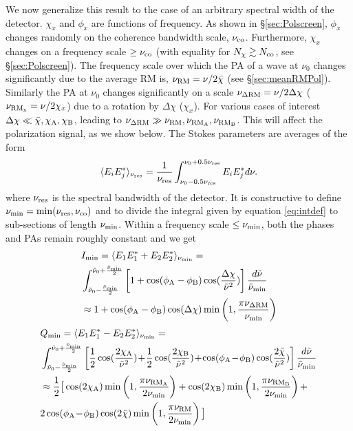 \documentclass[fleqn,usenatbib]{mnras}
\begin{document}
	
	We now generalize this result to the case of an arbitrary spectral width of the detector.
	$\chi_x$ and $\phi_x$ are functions of frequency. As shown in \S \ref{sec:Polscreen}, $\phi_x$ changes randomly on the coherence bandwidth scale, $\nu_{\rm co}$. Furthermore, $\chi_x$ changes on a frequency scale $\geq \nu_{\rm co}$ (with equality for $N_{\chi}\gtrsim N_{\rm co}$, see \S \ref{sec:Polscreen}).
	The frequency scale over which the PA of a wave at $\nu_0$ changes significantly due to the average RM is, $\nu_{\rm RM}=\nu/2\bar{\chi}$ (see \S \ref{sec:meanRMPol}). Similarly the PA at $\nu_0$ changes significantly on a scale $\nu_{\rm \Delta RM}=\nu/2\Delta\chi$ ( $\nu_{\rm RM_x}=\nu/2\chi_x$) due to a rotation by $\Delta \chi$ ($\chi_x$). For various cases of interest $\Delta \chi \ll \bar{\chi},\chi_{\rm A},\chi_{\rm B}$, leading to $\nu_{\rm \Delta RM}\gg\nu_{\rm RM}, \nu_{\rm RM_A}, \nu_{\rm RM_B}$. This will affect the polarization signal, as we show below.
	The Stokes parameters are averages of the form 
	\begin{equation}
		\label{eq:intdef}
		\langle E_{i}E_{j}^*\rangle_{\nu_{\rm res}}  = \frac{1}{\nu_{\rm res}}\int_{\nu_0-0.5\nu_{\rm res}}^{\nu_0+0.5\nu_{\rm res}}E_iE_j^*d\nu.
	\end{equation}
	where $\nu_{\rm res}$ is the spectral bandwidth of the detector. It is constructive to define $\nu_{\rm min}=\min(\nu_{\rm res},\nu_{\rm co})$ and to divide the integral given by equation \ref{eq:intdef} to sub-sections of length $\nu_{\rm min}$. Within a frequency scale $\leq \nu_{\rm min}$, both the phases and PAs remain roughly constant and we get
	\begin{eqnarray}
		\label{eq:Imin}
		& I_{\rm min}=\langle E_{1}E_{1}^*+E_{2}E_{2}^*\rangle_{\nu_{\rm min}}=\\ &
		\int_{\tilde{\nu}_0-\frac{\tilde{\nu}_{\rm min}}{2}}^{\tilde{\nu}_0+\frac{\tilde{\nu}_{\rm min}}{2}}\left[1+\cos(\phi_{\rm A}-\phi_{\rm B})\cos(\frac{\Delta \chi}{\tilde{\nu}^2})\right]\frac{d\tilde{\nu}}{\tilde{\nu}_{\rm min}}\nonumber\\&
		\approx 1+\cos(\phi_{\rm A}-\phi_{\rm B})\cos(\Delta \chi)\min\left(1,\frac{\pi\nu_{\rm \Delta RM}}{\nu_{\rm min}}\right) \nonumber
	\end{eqnarray}
	\begin{eqnarray}
		\label{eq:Qmin}
		& Q_{\rm min}=\langle E_{1}E_{1}^*-E_{2}E_{2}^*\rangle_{\nu_{\rm min}}=\\ &
		\int_{\tilde{\nu}_0-\frac{\tilde{\nu}_{\rm min}}{2}}^{\tilde{\nu}_0+\frac{\tilde{\nu}_{\rm min}}{2}}\left[\frac{1}{2}\cos(\frac{2\chi_{\rm A}}{\tilde{\nu}^2})\!+\!\frac{1}{2}\cos(\frac{2\chi_{\rm B}}{\tilde{\nu}^2})\!+\!\cos(\phi_{\rm A}\!-\!\phi_{\rm B})\cos(\frac{2\bar{\chi}}{\tilde{\nu}^2})\right]\frac{d\tilde{\nu}}{\tilde{\nu}_{\rm min}}\nonumber\\&
		\approx \frac{1}{2}\big[\cos(2\chi_{\rm A})\min\left(1,\frac{\pi\nu_{\rm RM_A}}{2\nu_{\rm min}}\right)+\cos(2\chi_{\rm B})\min\left(1,\frac{\pi\nu_{\rm RM_B}}{2\nu_{\rm min}}\right)+\nonumber \\& 2\cos(\phi_{\rm A}\!-\!\phi_{\rm B})\cos(2 \bar{\chi})\min\left(1,\frac{\pi\nu_{\rm RM}}{2\nu_{\rm min}}\right)\big]\nonumber
	\end{eqnarray}
\end{document}
